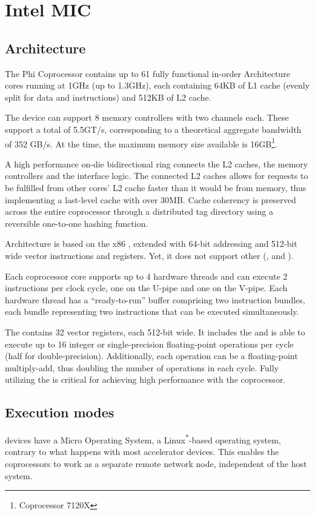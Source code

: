 \documentclass[../thesis]{subfiles}
\begin{document}
	\chapter{Intel MIC}
	\label{chp:mic}
	\section{Architecture}
	The \intel\xeon Phi Coprocessor contains up to 61 fully functional in-order \intel\mic Architecture cores running at 1GHz (up to 1.3GHz), each containing 64KB of L1 cache (evenly split for data and instructions) and 512KB of L2 cache.

	The device can support 8 memory controllers with two  channels each. These support a total of 5.5GT/s, corresponding to a theoretical aggregate bandwidth of 352 GB/s. At the time, the maximum memory size available is 16GB\footnote{\intel\xeonphi Coprocessor 7120X\cite{datasheet:XeonPhi:7120X}}.

	A high performance on-die bidirectional  ring connects the L2 caches, the memory controllers and the \pcie interface logic. The connected L2 caches allows for requests to be fulfilled from other cores' L2 cache faster than it would be from memory, thus implementing a last-level cache with over 30MB. Cache coherency is preserved across the entire coprocessor through a distributed tag directory using a reversible one-to-one hashing function.

	\intel\mic Architecture is based on the x86 \isa, extended with 64-bit addressing and 512-bit wide \simd vector instructions and registers. Yet, it does not support other \simd\isas (\mmx, \intel\sse and \intel\avx).

	Each coprocessor core supports up to 4 hardware threads and can execute 2 instructions per clock cycle, one on the U-pipe and one on the V-pipe. Each hardware thread has a ``ready-to-run'' buffer comprising two instruction bundles, each bundle representing two instructions that can be executed simultaneously.

	The \vpu contains 32 vector registers, each 512-bit wide. It includes the \emu and is able to execute up to 16 integer or single-precision floating-point operations per cycle (half for double-precision). Additionally, each operation can be a floating-point multiply-add, thus doubling the number of operations in each cycle. Fully utilizing the \vpu is critical for achieving high performance with the coprocessor.

	\section{Execution modes}
	\intel\mic devices have a Micro Operating System, a Linux\textsuperscript{*}-based operating system, contrary to what happens with most accelerator devices. This enables the coprocessors to work as a separate remote network node, independent of the host system.
\end{document}
